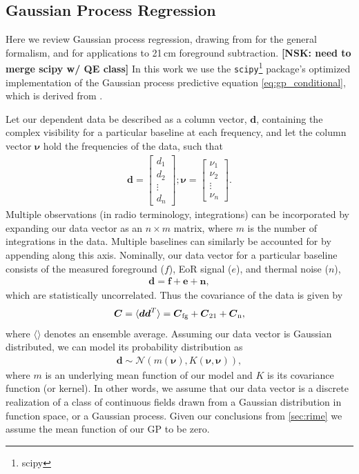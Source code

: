 \documentclass[a4paper,fleqn,usenatbib]{mnras}
\newcommand{\nsk}[1]{{\color{blue} \textbf{[NSK:  #1]}}}
\def\d{\boldsymbol{d}}
\def\e{\boldsymbol{e}}
\def\f{\boldsymbol{f}}
\def\n{\boldsymbol{n}}
\def\C{\boldsymbol{C}}
\def\Cfg{\boldsymbol{C}_{\rm fg}}
\def\Cto{\boldsymbol{C}_{\rm 21}}
\def\Cn{\boldsymbol{C}_{\rm n}}
\def\bnu{\boldsymbol{\nu}}
\begin{document}
\subsection{Gaussian Process Regression}
\label{sec:gpr}

Here we review Gaussian process regression, drawing from \citet{Rasmussen2006} for the general formalism, and \citet{Mertens2018} for applications to 21\,cm foreground subtraction.
\nsk{need to merge scipy w/ QE class}
In this work we use the \texttt{scipy}\footnote{scipy} package's optimized implementation of the Gaussian process predictive equation \autoref{eq:gp_conditional}, which is derived from \citet{Rasmussen2006}.

Let our dependent data be described as a column vector, $\d$, containing the complex visibility for a particular baseline at each frequency, and let the column vector $\boldsymbol{\nu}$ hold the frequencies of the data, such that
\begin{align}
\label{eq:dvec}
\d = \begin{bmatrix}d_1\\ d_2\\ \vdots\\ d_n\end{bmatrix}; \boldsymbol{\nu} = \begin{bmatrix}\nu_1\\ \nu_2\\ \vdots\\ \nu_n\end{bmatrix}.
\end{align}
Multiple observations (in radio terminology, integrations) can be incorporated by expanding our data vector as an $n\times m$ matrix, where $m$ is the number of integrations in the data.
Multiple baselines can similarly be accounted for by appending along this axis.
Nominally, our data vector for a particular baseline consists of the measured foreground ($f$), EoR signal ($e$), and thermal noise ($n$),
\begin{align}
\label{eq:data_vec}
\d = \f + \e + \n,
\end{align}
which are statistically uncorrelated.
Thus the covariance of the data is given by
\begin{align}
\label{eq:data_cov}
\C = \langle\d\d^T\rangle = \Cfg + \Cto + \Cn,
\end{align}
where $\langle\rangle$ denotes an ensemble average.
Assuming our data vector is Gaussian distributed, we can model its probability distribution as
\begin{align}
\d\sim\mathcal{N}\left(m(\bnu), K(\bnu, \bnu)\right),
\end{align}
where $m$ is an underlying mean function of our model and $K$ is its covariance function (or kernel).
In other words, we assume that our data vector is a discrete realization of a class of continuous fields drawn from a Gaussian distribution in function space, or a Gaussian process.
Given our conclusions from \autoref{sec:rime} we assume the mean function of our GP to be zero.
\end{document}
